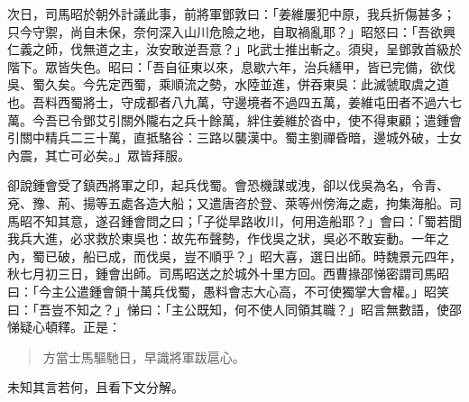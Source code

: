 次日，司馬昭於朝外計議此事，前將軍鄧敦曰：「姜維屢犯中原，我兵折傷甚多；只今守禦，尚自未保，奈何深入山川危險之地，自取禍亂耶？」昭怒曰：「吾欲興仁義之師，伐無道之主，汝安敢逆吾意？」叱武士推出斬之。須臾，呈鄧敦首級於階下。眾皆失色。昭曰：「吾自征東以來，息歇六年，治兵繕甲，皆已完備，欲伐吳、蜀久矣。今先定西蜀，乘順流之勢，水陸並進，併吞東吳：此滅虢取虞之道也。吾料西蜀將士，守成都者八九萬，守邊境者不過四五萬，姜維屯田者不過六七萬。今吾已令鄧艾引關外隴右之兵十餘萬，絆住姜維於沓中，使不得東顧；遣鍾會引關中精兵二三十萬，直抵駱谷：三路以襲漢中。蜀主劉禪昏暗，邊城外破，士女內震，其亡可必矣。」眾皆拜服。

卻說鍾會受了鎮西將軍之印，起兵伐蜀。會恐機謀或洩，卻以伐吳為名，令青、兗、豫、荊、揚等五處各造大船；又遣唐咨於登、萊等州傍海之處，拘集海船。司馬昭不知其意，遂召鍾會問之曰；「子從旱路收川，何用造船耶？」會曰：「蜀若聞我兵大進，必求救於東吳也：故先布聲勢，作伐吳之狀，吳必不敢妄動。一年之內，蜀已破，船已成，而伐吳，豈不順乎？」昭大喜，選日出師。時魏景元四年，秋七月初三日，鍾會出師。司馬昭送之於城外十里方回。西曹掾邵悌密謂司馬昭曰：「今主公遣鍾會領十萬兵伐蜀，愚料會志大心高，不可使獨掌大會權。」昭笑曰：「吾豈不知之？」悌曰：「主公既知，何不使人同領其職？」昭言無數語，使邵悌疑心頓釋。正是：

\begin{quote}
方當士馬驅馳日，早識將軍跋扈心。
\end{quote}

未知其言若何，且看下文分解。
